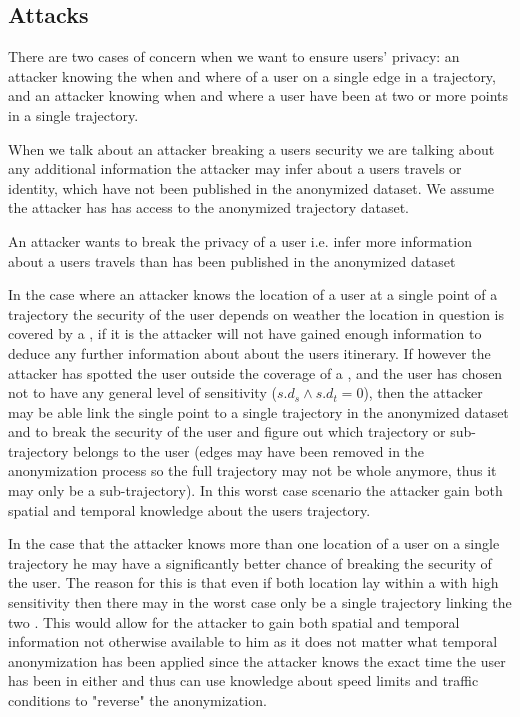 \subsection{Attacks}\label{subsec:attack}

There are two cases of concern when we want to ensure users' privacy: an attacker knowing the when and where of a user on a single edge in a trajectory, and an attacker knowing when and where a user have been at two or more points in a single trajectory.

When we talk about an attacker breaking a users security we are talking about any additional information the attacker may infer about a users travels or identity, which have not been published in the anonymized dataset. We assume the attacker has has access to the anonymized trajectory dataset.

An attacker wants to break the privacy of a user i.e. infer more information about a users travels than has been published in the anonymized dataset

In the case where an attacker knows the location of a user at a single point of a trajectory the security of the user depends on weather the location in question is covered by a \poins, if it is the attacker will not have gained enough information to deduce any further information about about the users itinerary. If however the attacker has spotted the user outside the coverage of a \poins, and the user has chosen not to have any general level of sensitivity ($s.d_s \wedge s.d_t = 0$), then the attacker may be able link the single point to a single trajectory in the anonymized dataset and to break the security of the user and figure out which trajectory or sub-trajectory belongs to the user (edges may have been removed in the anonymization process so the full trajectory may not be whole anymore, thus it may only be a sub-trajectory). In this worst case scenario the attacker gain both spatial and temporal knowledge about the users trajectory.

In the case that the attacker knows more than one location of a user on a single trajectory he may have a significantly better chance of breaking the security of the user. The reason for this is that even if both location lay within a \poi with high sensitivity then there may in the worst case only be a single trajectory linking the two \poisns. This would allow for the attacker to gain both spatial and temporal information not otherwise available to him as it does not matter what temporal anonymization has been applied since the attacker knows the exact time the user has been in either \poi and thus can use knowledge about speed limits and traffic conditions to "reverse" the anonymization.


